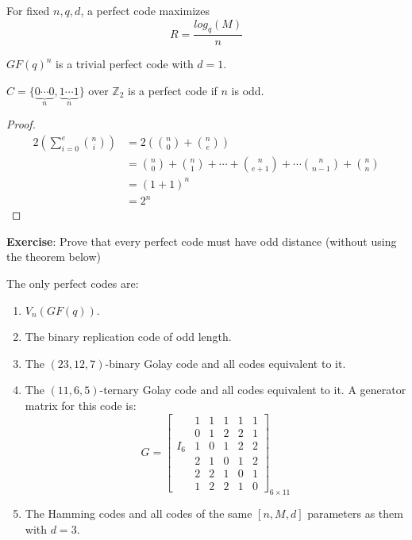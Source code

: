 For fixed $ n,q,d $, a perfect code maximizes
\[ R=\frac{log_q(M)}{n} \]
\begin{exbox}
    \begin{example}
        $ GF(q)^n $ is a trivial perfect code with $ d=1 $.

        $ C=\{\underbrace{0\cdots 0}_{n},\underbrace{1\cdots 1}_{n}\} $ over $ \mathbb{Z}_2 $
        is a perfect code if $ n $ is odd.
    \end{example}
\end{exbox}

\begin{proof}
    \begin{align*}
        2\left( \sum\limits_{i=0}^{e} \binom{n}{i} \right)
         & =2\left( \binom{n}{0}+\binom{n}{e} \right)                                         \\
         & =\binom{n}{0}+\binom{n}{1}+\cdots+\binom{n}{e+1}+\cdots\binom{n}{n-1}+\binom{n}{n} \\
         & =(1+1)^n                                                                           \\
         & =2^n
    \end{align*}
\end{proof}

\textbf{Exercise}: Prove that every perfect code must have odd distance
(without using the theorem below)

\begin{thmbox}
    \begin{theorem}[Tietäväinen, 1973]
        The only perfect codes are:
        \begin{enumerate}[(1)]
            \item $ V_n(GF(q)) $.
            \item The binary replication code of odd length.
            \item The $ (23,12,7) $-binary Golay code and all codes equivalent to it.
            \item The $ (11,6,5) $-ternary Golay code and all codes equivalent to it.
                  A generator matrix for this code is:
                  \[ G=
                      \left[\begin{array}{c|ccccc}
                                  & 1 & 1 & 1 & 1 & 1 \\
                                  & 0 & 1 & 2 & 2 & 1 \\
                              I_6 & 1 & 0 & 1 & 2 & 2 \\
                                  & 2 & 1 & 0 & 1 & 2 \\
                                  & 2 & 2 & 1 & 0 & 1 \\
                                  & 1 & 2 & 2 & 1 & 0
                          \end{array}\right]_{6\times 11} \]
            \item The Hamming codes and all codes of the same $ [n,M,d] $ parameters as them
                  with $ d=3 $.
        \end{enumerate}
    \end{theorem}
\end{thmbox}

